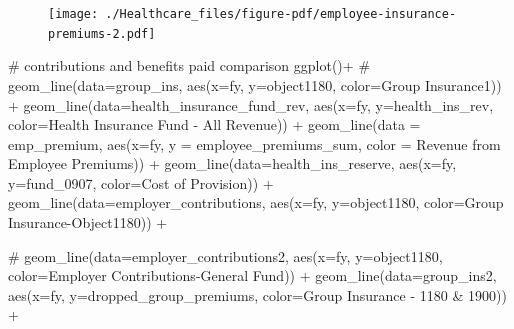 \documentclass[
  letterpaper,
  DIV=11,
  numbers=noendperiod]{scrreport}
\newenvironment{Shaded}{\begin{snugshade}}{\end{snugshade}}
\newcommand{\AttributeTok}[1]{\textcolor[rgb]{0.40,0.45,0.13}{#1}}
\newcommand{\CommentTok}[1]{\textcolor[rgb]{0.37,0.37,0.37}{#1}}
\newcommand{\FunctionTok}[1]{\textcolor[rgb]{0.28,0.35,0.67}{#1}}
\newcommand{\NormalTok}[1]{\textcolor[rgb]{0.00,0.23,0.31}{#1}}
\newcommand{\SpecialCharTok}[1]{\textcolor[rgb]{0.37,0.37,0.37}{#1}}
\newcommand{\StringTok}[1]{\textcolor[rgb]{0.13,0.47,0.30}{#1}}
\begin{document}
\begin{figure}[H]

{\centering \texttt{[image: ./Healthcare\_files/figure-pdf/employee-insurance-premiums-2.pdf]}

}

\end{figure}

\begin{Shaded}
\begin{Highlighting}[]
\CommentTok{\# contributions and benefits paid comparison}
\FunctionTok{ggplot}\NormalTok{()}\SpecialCharTok{+}
  \CommentTok{\#  geom\_line(data=group\_ins, aes(x=fy, y=object1180, color=\textquotesingle{}Group Insurance1\textquotesingle{})) +}
      \FunctionTok{geom\_line}\NormalTok{(}\AttributeTok{data=}\NormalTok{health\_insurance\_fund\_rev, }\FunctionTok{aes}\NormalTok{(}\AttributeTok{x=}\NormalTok{fy, }\AttributeTok{y=}\NormalTok{health\_ins\_rev, }\AttributeTok{color=}\StringTok{\textquotesingle{}Health Insurance Fund {-} All Revenue\textquotesingle{}}\NormalTok{)) }\SpecialCharTok{+}
 \FunctionTok{geom\_line}\NormalTok{(}\AttributeTok{data =}\NormalTok{ emp\_premium, }\FunctionTok{aes}\NormalTok{(}\AttributeTok{x=}\NormalTok{fy, }\AttributeTok{y =}\NormalTok{ employee\_premiums\_sum, }\AttributeTok{color =} \StringTok{\textquotesingle{}Revenue from Employee Premiums\textquotesingle{}}\NormalTok{)) }\SpecialCharTok{+}
    \FunctionTok{geom\_line}\NormalTok{(}\AttributeTok{data=}\NormalTok{health\_ins\_reserve, }\FunctionTok{aes}\NormalTok{(}\AttributeTok{x=}\NormalTok{fy, }\AttributeTok{y=}\NormalTok{fund\_0907, }\AttributeTok{color=}\StringTok{\textquotesingle{}Cost of Provision\textquotesingle{}}\NormalTok{)) }\SpecialCharTok{+}
    \FunctionTok{geom\_line}\NormalTok{(}\AttributeTok{data=}\NormalTok{employer\_contributions, }\FunctionTok{aes}\NormalTok{(}\AttributeTok{x=}\NormalTok{fy, }\AttributeTok{y=}\NormalTok{object1180, }\AttributeTok{color=}\StringTok{\textquotesingle{}Group Insurance{-}Object1180\textquotesingle{}}\NormalTok{)) }\SpecialCharTok{+}

 \CommentTok{\#   geom\_line(data=employer\_contributions2, aes(x=fy, y=object1180, color=\textquotesingle{}Employer Contributions{-}General Fund\textquotesingle{})) +}
  \FunctionTok{geom\_line}\NormalTok{(}\AttributeTok{data=}\NormalTok{group\_ins2, }\FunctionTok{aes}\NormalTok{(}\AttributeTok{x=}\NormalTok{fy, }\AttributeTok{y=}\NormalTok{dropped\_group\_premiums, }\AttributeTok{color=}\StringTok{\textquotesingle{}Group Insurance {-} 1180 \& 1900\textquotesingle{}}\NormalTok{)) }\SpecialCharTok{+}


\end{Highlighting}
\end{Shaded}
\end{document}

